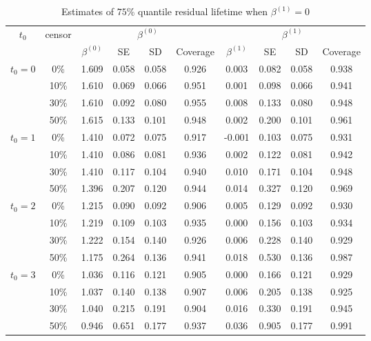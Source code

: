 \documentclass[12pt]{article}
\begin{document}
	\begin{table}[H]
		\caption{Estimates of $75\%$ quantile residual lifetime when $\beta^{(1)}=0$}
		\centering
		\begin{tabular}{|c|c|c|c|c|c|c|c|c|c|}
			\hline
			\multirow{2}{*}{$t_0$} & \multirow{2}{*}{censor} & \multicolumn{4}{c|}{$\beta^{(0)}$} & \multicolumn{4}{c|}{$\beta^{(1)}$}\\ \cline{3-10}
			& & $\beta^{(0)}$ & SE & SD  & Coverage  & $\beta^{(1)}$ & SE & SD & Coverage\\
			\hline\hline
			\multirow{4}{*}{$t_0=0$} & 0\% & 1.609 & 0.058 & 0.058 & 0.926 & 0.003 & 0.082 & 0.058 & 0.938 \\
			& 10\% & 1.610 & 0.069 & 0.066 & 0.951 & 0.001 & 0.098 & 0.066 & 0.941 \\
			& 30\% & 1.610 & 0.092 & 0.080 & 0.955 & 0.008 & 0.133 & 0.080 & 0.948 \\
			& 50\% & 1.615 & 0.133 & 0.101 & 0.948 & 0.002 & 0.200 & 0.101 & 0.961 \\
			\hline
			\multirow{4}{*}{$t_0=1$} & 0\% & 1.410 & 0.072 & 0.075 & 0.917 & -0.001 & 0.103 & 0.075 & 0.931 \\
			& 10\% & 1.410 & 0.086 & 0.081 & 0.936 & 0.002 & 0.122 & 0.081 & 0.942 \\
			& 30\% & 1.410 & 0.117 & 0.104 & 0.940 & 0.010 & 0.171 & 0.104 & 0.948 \\
			& 50\% & 1.396 & 0.207 & 0.120 & 0.944 & 0.014 & 0.327 & 0.120 & 0.969 \\
			\hline
			\multirow{4}{*}{$t_0=2$} & 0\% & 1.215 & 0.090 & 0.092 & 0.906 & 0.005 & 0.129 & 0.092 & 0.930 \\
			& 10\% & 1.219 & 0.109 & 0.103 & 0.935 & 0.000 & 0.156 & 0.103 & 0.934 \\
			& 30\% & 1.222 & 0.154 & 0.140 & 0.926 & 0.006 & 0.228 & 0.140 & 0.929 \\
			& 50\% & 1.175 & 0.264 & 0.136 & 0.941 & 0.018 & 0.530 & 0.136 & 0.987 \\
			\hline
			\multirow{4}{*}{$t_0=3$} & 0\% & 1.036 & 0.116 & 0.121 & 0.905 & 0.000 & 0.166 & 0.121 & 0.929 \\
			& 10\% & 1.037 & 0.140 & 0.138 & 0.907 & 0.006 & 0.205 & 0.138 & 0.925 \\
			& 30\% & 1.040 & 0.215 & 0.191 & 0.904 & 0.016 & 0.330 & 0.191 & 0.945 \\
			& 50\% & 0.946 & 0.651 & 0.177 & 0.937 & 0.036 & 0.905 & 0.177 & 0.991 \\	
			\hline
		\end{tabular}
	\end{table}
\end{document}
